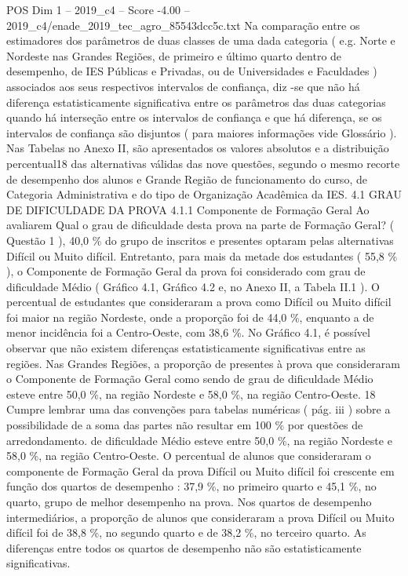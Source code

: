 \begin{textsample}{POS Dim 1 – 2019\_c4 – Score -4.00 – 2019\_c4/enade\_2019\_tec\_agro\_85543dcc5c.txt}
Na comparação entre os estimadores dos parâmetros de duas classes de uma dada categoria ( e.g.
Norte e Nordeste nas Grandes Regiões, de primeiro e último quarto dentro de desempenho, de IES Públicas e Privadas, ou de Universidades e Faculdades ) associados aos seus respectivos intervalos de confiança, diz -se que não há diferença estatisticamente significativa entre os parâmetros das duas categorias quando há interseção entre os intervalos de confiança e que há diferença, se os intervalos de confiança são disjuntos ( para maiores informações vide Glossário ).
Nas Tabelas no Anexo II, são apresentados os valores absolutos e a distribuição percentual18 das alternativas válidas das nove questões, segundo o mesmo recorte de desempenho dos alunos e Grande Região de funcionamento do curso, de Categoria Administrativa e do tipo de Organização Acadêmica da IES. 4.1 GRAU DE DIFICULDADE DA PROVA 4.1.1 Componente de Formação Geral Ao avaliarem Qual o grau de dificuldade desta prova na parte de Formação Geral? ( Questão 1 ), 40,0 \% do grupo de inscritos e presentes optaram pelas alternativas Difícil ou Muito difícil.
Entretanto, para mais da metade dos estudantes ( 55,8 \% ), o Componente de Formação Geral da prova foi considerado com grau de dificuldade Médio ( Gráfico 4.1, Gráfico 4.2 e, no Anexo II, a Tabela II.1 ).
O percentual de estudantes que consideraram a prova como Difícil ou Muito difícil foi maior na região Nordeste, onde a proporção foi de 44,0 \%, enquanto a de menor incidência foi a Centro-Oeste, com 38,6 \%.
No Gráfico 4.1, é possível observar que não existem diferenças estatisticamente significativas entre as regiões.
Nas Grandes Regiões, a proporção de presentes à prova que consideraram o Componente de Formação Geral como sendo de grau de dificuldade Médio esteve entre 50,0 \%, na região Nordeste e 58,0 \%, na região Centro-Oeste. 18 Cumpre lembrar uma das convenções para tabelas numéricas ( pág. iii ) sobre a possibilidade de a soma das partes não resultar em 100 \% por questões de arredondamento. de dificuldade Médio esteve entre 50,0 \%, na região Nordeste e 58,0 \%, na região Centro-Oeste.
O percentual de alunos que consideraram o componente de Formação Geral da prova Difícil ou Muito difícil foi crescente em função dos quartos de desempenho : 37,9 \%, no primeiro quarto e 45,1 \%, no quarto, grupo de melhor desempenho na prova.
Nos quartos de desempenho intermediários, a proporção de alunos que consideraram a prova Difícil ou Muito difícil foi de 38,8 \%, no segundo quarto e de 38,2 \%, no terceiro quarto.
As diferenças entre todos os quartos de desempenho não são estatisticamente significativas.

\end{textsample}
